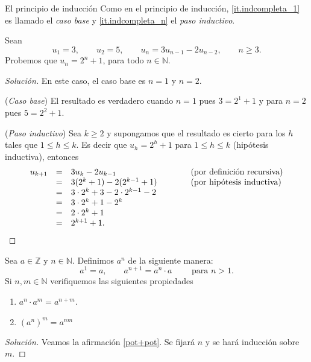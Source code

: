\begin{section}{El principio de inducción}
Como en el principio de inducción,  \ref{it.indcompleta_1}  es llamado el \textit{caso base} y \ref{it.indcompleta_n} el \textit{paso inductivo}.  



\begin{ejemplo*}
Sean $$u_1 = 3,\qquad u_2 = 5,\qquad u_n = 3u_{n-1}- 2u_{n-2},\qquad  n \ge 3.$$
Probemos que $u_n = 2^n + 1$, para todo $n \in  \mathbb N$.
\begin{proof}[Solución] En este caso, el caso base es $n=1$ y $n=2$.

\noindent(\textit{Caso  base}) El resultado es verdadero cuando $n= 1$ pues $3 = 2^1+1$ y para $n=2$ pues $ 5 =2^2+1$.

\noindent (\textit{Paso  inductivo}) Sea $k \ge 2$ y supongamos que el resultado  es cierto para los $h$ tales que  $1 \le h \le k$. Es decir que $u_h = 2^h+1$ para $1 \le h \le k$  (hipótesis inductiva), entonces
$$
\begin{matrix*}[l]u_{k+1} &=& 3u_k -2u_{k-1} \hfill &\qquad &\text{(por definición recursiva)} \hfill \\
&=& 3(2^k+1)-2(2^{k-1}+1) \hfill &\qquad &\text{(por hipótesis inductiva)}\hfill \\
&=& 3\cdot 2^k+3-2\cdot 2^{k-1}-2 \hfill &\qquad & \\
&=& 3\cdot 2^k+1- 2^{k} \hfill &\qquad & \\
&=& 2\cdot 2^k+1 \hfill &\qquad & \\
&=& 2^{k+1}+1. \hfill &\qquad & 
\end{matrix*}
$$
\end{proof}
\end{ejemplo*}


\begin{ejemplo*}
Sea $a \in \mathbb Z$ y $n \in \mathbb N$. Definimos $a^n$ de la siguiente manera:
\begin{equation}\label{potencia}
a^1 = a, \qquad a^{n+1} = a^{n}\cdot a \qquad \text{ para $n >1$.}
\end{equation}
Si $n,m \in \mathbb N$ verifiquemos las siguientes propiedades

\begin{enumerate}[label=\textit{\alph*)}]
\item \label{pot+pot} $a^{n} \cdot a^m = a^{n+m}$.
\item \label{potpot} $(a^n)^m = a^{nm}$
\end{enumerate}
\end{ejemplo*}
\begin{proof}[Solución] 
    Veamos la afirmación \ref{pot+pot}. Se fijará $n$ y se hará inducción sobre $m$. 
    

\end{proof}
\end{section}
